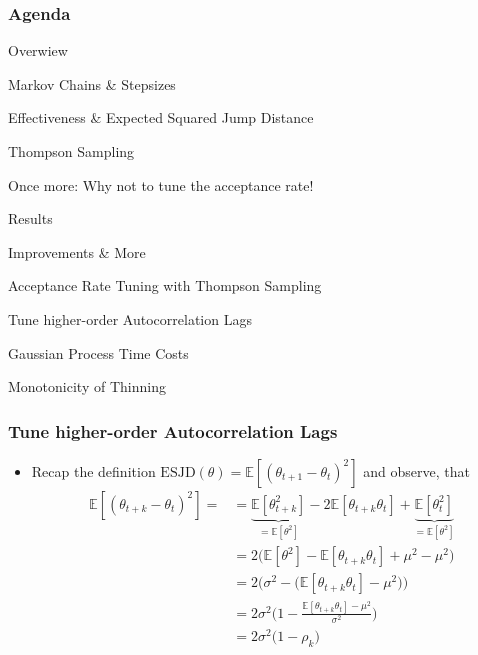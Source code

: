 \begin{frame}[c]
    \frametitle{Agenda}
    \begin{itemize}
        {\color{lgray}
        \item Overwiew
        }
        \begin{itemize}
            {\color{lgray}
            \item Markov Chains \& Stepsizes
            \item Effectiveness \& Expected Squared Jump Distance 
            \item Thompson Sampling
            \item Once more: Why not to tune the acceptance rate!
            }
        \end{itemize}
        {\color{lgray}
        \item Results
        }
        \item Improvements \& More
        \begin{itemize}
            {\color{lgray}
            \item Acceptance Rate Tuning with Thompson Sampling
        }
            \item Tune higher-order Autocorrelation Lags
            {\color{lgray}
            \item Gaussian Process Time Costs
            \item Monotonicity of Thinning
        }
        \end{itemize}
    \end{itemize}
\end{frame}

\begin{frame}[c]
    \frametitle{Tune higher-order Autocorrelation Lags}
    \begin{itemize}
        \item Recap the definition $\mathrm{ESJD}(\theta) = \mathbb{E}[(\theta_{t+1} - \theta_t)^2]$ and observe, that
            \begin{align*}
                \mathbb{E}[(\theta_{t+k} - \theta_t)^2] = 
                &= \underbrace{\mathbb{E}[\theta_{t+k}^2]}_{=\mathbb{E}[\theta^2]} - 2\mathbb{E}[\theta_{t+k}\theta_t] + \underbrace{\mathbb{E}[\theta_t^2]}_{=\mathbb{E}[\theta^2]} \\
                &= 2\big(\mathbb{E}[\theta^2] - \mathbb{E}[\theta_{t+k}\theta_t]  + \mu^2 - \mu^2\big)\\
                &= 2\big(\sigma^2 - \big(\mathbb{E}[\theta_{t+k}\theta_t]  - \mu^2\big)\big)\\
                &= 2\sigma^2\big(1 - \frac{\mathbb{E}[\theta_{t+k}\theta_t]  - \mu^2}{\sigma^2}\big)\\
                &= 2\sigma^2\big(1 - \rho_k\big)\\
            \end{align*}
    \end{itemize}
\end{frame}

